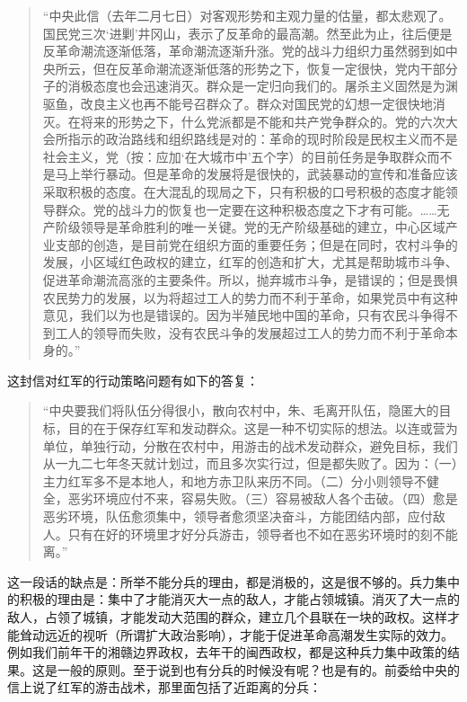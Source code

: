\begin{quote}
“中央此信（去年二月七日）对客观形势和主观力量的估量，都太悲观了。国民党三次‘进剿’井冈山，表示了反革命的最高潮。然至此为止，往后便是反革命潮流逐渐低落，革命潮流逐渐升涨。党的战斗力组织力虽然弱到如中央所云，但在反革命潮流逐渐低落的形势之下，恢复一定很快，党内干部分子的消极态度也会迅速消灭。群众是一定归向我们的。屠杀主义固然是为渊驱鱼，改良主义也再不能号召群众了。群众对国民党的幻想一定很快地消灭。在将来的形势之下，什么党派都是不能和共产党争群众的。党的六次大会所指示的政治路线和组织路线是对的：革命的现时阶段是民权主义而不是社会主义，党（按：应加‘在大城市中’五个字）的目前任务是争取群众而不是马上举行暴动。但是革命的发展将是很快的，武装暴动的宣传和准备应该采取积极的态度。在大混乱的现局之下，只有积极的口号积极的态度才能领导群众。党的战斗力的恢复也一定要在这种积极态度之下才有可能。……无产阶级领导是革命胜利的唯一关键。党的无产阶级基础的建立，中心区域产业支部的创造，是目前党在组织方面的重要任务；但是在同时，农村斗争的发展，小区域红色政权的建立，红军的创造和扩大，尤其是帮助城市斗争、促进革命潮流高涨的主要条件。所以，抛弃城市斗争，是错误的；但是畏惧农民势力的发展，以为将超过工人的势力而不利于革命，如果党员中有这种意见，我们以为也是错误的。因为半殖民地中国的革命，只有农民斗争得不到工人的领导而失败，没有农民斗争的发展超过工人的势力而不利于革命本身的。”
\end{quote}

这封信对红军的行动策略问题有如下的答复：

\begin{quote}
“中央要我们将队伍分得很小，散向农村中，朱、毛离开队伍，隐匿大的目标，目的在于保存红军和发动群众。这是一种不切实际的想法。以连或营为单位，单独行动，分散在农村中，用游击的战术发动群众，避免目标，我们从一九二七年冬天就计划过，而且多次实行过，但是都失败了。因为：（一）主力红军多不是本地人，和地方赤卫队来历不同。（二）分小则领导不健全，恶劣环境应付不来，容易失败。（三）容易被敌人各个击破。（四）愈是恶劣环境，队伍愈须集中，领导者愈须坚决奋斗，方能团结内部，应付敌人。只有在好的环境里才好分兵游击，领导者也不如在恶劣环境时的刻不能离。”
\end{quote}

这一段话的缺点是：所举不能分兵的理由，都是消极的，这是很不够的。兵力集中的积极的理由是：集中了才能消灭大一点的敌人，才能占领城镇。消灭了大一点的敌人，占领了城镇，才能发动大范围的群众，建立几个县联在一块的政权。这样才能耸动远近的视听（所谓扩大政治影响），才能于促进革命高潮发生实际的效力。例如我们前年干的湘赣边界政权，去年干的闽西政权，都是这种兵力集中政策的结果。这是一般的原则。至于说到也有分兵的时候没有呢？也是有的。前委给中央的信上说了红军的游击战术，那里面包括了近距离的分兵：

